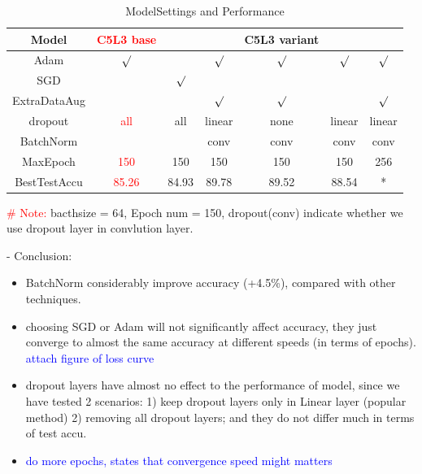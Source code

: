 \documentclass{article}
\begin{document}
\begin{table}[htbp]
  \centering
  \caption{ModelSettings and Performance}
  \label{tab:model-compare}
  \begin{tabular}{|c|c|ccccc|} 
    \hline
    Model &\textcolor{red}{C5L3 base} &  &  & C5L3 variant & &   \\
    \hline
    Adam &  \textcolor{red}{ $\surd$ }   &  & $\surd$ & $\surd$ & $\surd$  & $\surd$\\ 
    SGD & & $\surd$   & & &  &\\
    ExtraDataAug& &  & $\surd$ &  $\surd$ &  &$\surd$\\
    dropout &\textcolor{red}{all} & all   & linear& none & linear  & linear \\ 
    BatchNorm & & & conv & conv  & conv & conv \\ 
    MaxEpoch & \textcolor{red}{150} & 150 & 150 & 150  & 150 & 256 \\
    \hline
    BestTestAccu & \textcolor{red}{85.26} &84.93 &89.78 & 89.52& 88.54 & * \\
    \hline
  \end{tabular} 
\end{table}


\textcolor{red}{\# Note:} bacthsize = 64, Epoch num = 150, dropout(conv) indicate whether we use dropout layer in convlution layer.

\noindent - Conclusion: 
\begin{itemize}
  \item BatchNorm considerably improve accuracy (+4.5\%), compared with other techniques.
  \item choosing SGD or Adam will not significantly affect accuracy, they just converge to almost the same accuracy at different speeds (in terms of epochs). \textcolor{blue}{attach figure of loss curve}
  \item dropout layers have almost no effect to the performance of model, since we have tested 2 scenarios: 1) keep dropout layers only in Linear layer (popular method) 2) removing all dropout layers; and they do not differ much in terms of test accu.
  \item \textcolor{blue}{do more epochs, states that convergence speed might matters}
\end{itemize}

\end{document}
